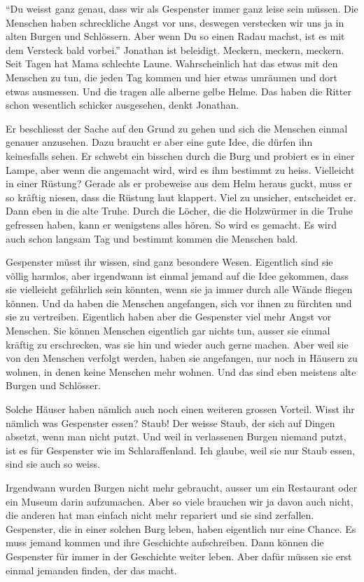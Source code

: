 \enquote{Du weisst ganz genau, dass wir als Gespenster immer ganz leise sein müssen. Die Menschen haben schreckliche Angst vor uns, deswegen verstecken wir uns ja in alten Burgen und Schlössern. Aber wenn Du so einen Radau machst, ist es mit dem Versteck bald vorbei.} Jonathan ist beleidigt. Meckern, meckern, meckern. Seit Tagen hat Mama schlechte Laune. Wahrscheinlich hat das etwas mit den Menschen zu tun, die jeden Tag kommen und hier etwas umräumen und dort etwas ausmessen. Und die tragen alle alberne gelbe Helme. Das haben die Ritter schon wesentlich schicker ausgesehen, denkt Jonathan. 

Er beschliesst der Sache auf den Grund zu gehen und sich die Menschen einmal genauer anzusehen. Dazu braucht er aber eine gute Idee, die dürfen ihn keinesfalls sehen. Er schwebt ein bisschen durch die Burg und probiert es in einer Lampe, aber wenn die angemacht wird, wird es ihm bestimmt zu heiss. Vielleicht in einer Rüstung? Gerade als er probeweise aus dem Helm heraus guckt, muss er so kräftig niesen, dass die Rüstung laut klappert. Viel zu unsicher, entscheidet er. Dann eben in die alte Truhe. Durch die Löcher, die die Holzwürmer in die Truhe gefressen haben, kann er wenigstens alles hören. So wird es gemacht. Es wird auch schon langsam Tag und bestimmt kommen die Menschen bald. 

\medskip
\begin{mdframed}[style=mystyle]
Gespenster müsst ihr wissen, sind ganz besondere Wesen. Eigentlich sind sie völlig harmlos, aber irgendwann ist einmal jemand auf die Idee gekommen, dass sie vielleicht gefährlich sein könnten, wenn sie ja immer durch alle Wände fliegen können. Und da haben die Menschen angefangen, sich vor ihnen zu fürchten und sie zu vertreiben. Eigentlich haben aber die Gespenster viel mehr Angst vor Menschen. Sie können Menschen eigentlich gar nichts tun, ausser sie einmal kräftig zu erschrecken, was sie hin und wieder auch gerne machen. Aber weil sie von den Menschen verfolgt werden, haben sie angefangen, nur noch in Häusern zu wohnen, in denen keine Menschen mehr wohnen. Und das sind eben meistens alte Burgen und Schlösser.

Solche Häuser haben nämlich auch noch einen weiteren grossen Vorteil. Wisst ihr nämlich was Gespenster essen? Staub! Der weisse Staub, der sich auf Dingen absetzt, wenn man nicht putzt. Und weil in verlassenen Burgen niemand putzt, ist es für Gespenster wie im Schlaraffenland. Ich glaube, weil sie nur Staub essen, sind sie auch so weiss.

Irgendwann wurden Burgen nicht mehr gebraucht, ausser um ein Restaurant oder ein Museum darin aufzumachen. Aber so viele brauchen wir ja davon auch nicht, die anderen hat man einfach nicht mehr repariert und sie sind zerfallen. Gespenster, die in einer solchen Burg leben, haben eigentlich nur eine Chance. Es muss jemand kommen und ihre Geschichte aufschreiben. Dann können die Gespenster für immer in der Geschichte weiter leben. Aber dafür müssen sie erst einmal jemanden finden, der das macht.
\end{mdframed}\medskip

